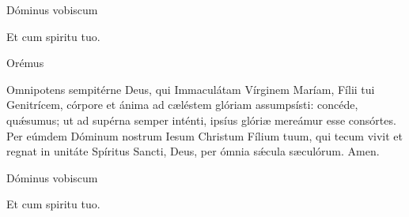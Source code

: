 


\rubric{\Vbar} Dóminus vobiscum

\rubric{\Rbar} Et cum spiritu tuo.

Orémus

Omnipotens sempitérne Deus, qui Immaculátam Vírginem Maríam, Fílii tui Genitrícem, córpore et ánima ad cæléstem glóriam assumpsísti: concéde, quǽsumus; ut ad supérna semper inténti, ipsíus glóriæ mereámur esse consórtes. Per eúmdem Dóminum nostrum Iesum Christum Fílium tuum, qui tecum vivit et regnat in unitáte Spíritus Sancti, Deus, per ómnia sǽcula sæculórum.\rubric{\Rbar} Amen.

\rubric{\Vbar} Dóminus vobiscum

\rubric{\Rbar} Et cum spiritu tuo.
